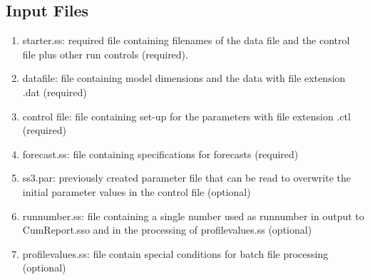 	\subsection{Input Files}
	\begin{enumerate}
		\item starter.ss:   required file containing filenames of the data file and the control file plus other run controls (required).
		\item datafile:  file containing model dimensions and the data with file extension .dat (required)
		\item control file:  file containing set-up for the parameters with file extension .ctl (required)
		\item forecast.ss:  file containing specifications for forecasts (required) 
		\item ss3.par:  previously created parameter file that can be read to overwrite the initial parameter values in the control file (optional)
		\item runnumber.ss:  file containing a single number used as runnumber in output to CumReport.sso and in the processing of profilevalues.ss (optional)
		\item profilevalues.ss:  file contain special conditions for batch file processing (optional)
	\end{enumerate}
	
